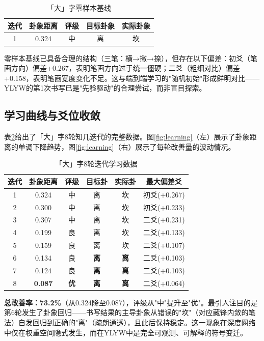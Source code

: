 \begin{table}[htbp]
\centering
\caption{「大」字零样本基线}
\label{tab:baseline}
\begin{tabular}{ccccc}
\toprule
迭代 & 卦象距离 & 评级 & 目标卦象 & 实际卦象 \\
\midrule
1 & 0.324 & 中 & 离 & 坎 \\
\bottomrule
\end{tabular}
\end{table}

零样本基线已具备合理的结构（三笔：横→撇→捺），但存在以下偏差：初爻（笔画方向）偏差+0.267，表明笔画方向过于统一僵硬；二爻（粗细对比）偏差+0.158，表明笔画宽度变化不足。这与端到端学习的"随机初始"形成鲜明对比——YLYW的第1次书写已是"先验驱动"的合理尝试，而非盲目探索。

\subsection{学习曲线与爻位收敛}

表\ref{tab:learning_curve}给出了「大」字8轮知几迭代的完整数据。图\ref{fig:learning}（左）展示了卦象距离的单调下降趋势，图\ref{fig:learning}（右）展示了每轮改善量的波动情况。

\begin{table}[htbp]
\centering
\caption{「大」字8轮迭代学习数据}
\label{tab:learning_curve}
\begin{tabular}{cccccc}
\toprule
迭代 & 卦象距离 & 评级 & 目标卦 & 实际卦 & 最大偏差爻 \\
\midrule
1 & 0.324 & 中 & 离 & 坎 & 初爻(+0.267) \\
2 & 0.300 & 中 & 离 & 坎 & 初爻(+0.233) \\
3 & 0.307 & 中 & 离 & 坎 & 二爻(+0.231) \\
4 & 0.199 & 良 & 离 & 坎 & 二爻(+0.133) \\
5 & 0.159 & 良 & 离 & 坎 & 二爻(+0.107) \\
6 & 0.134 & 良 & \textbf{离} & \textbf{离} & 二爻(+0.103) \\
7 & 0.124 & 良 & \textbf{离} & \textbf{离} & 二爻(+0.103) \\
8 & \textbf{0.087} & \textbf{优} & \textbf{离} & \textbf{离} & 二爻(+0.064) \\
\bottomrule
\end{tabular}
\end{table}

\textbf{总改善率：73.2\%}（从0.324降至0.087），评级从"中"提升至"优"。最引人注目的是第6轮发生了卦象回归——书写结果的主导卦象从错误的"坎"（对应藏锋内敛的笔法）自发回归到正确的"离"（疏朗通透），且此后保持稳定。这一现象在深度网络中仅在权重空间隐式发生，而在YLYW中是完全可观测、可解释的符号变迁。

